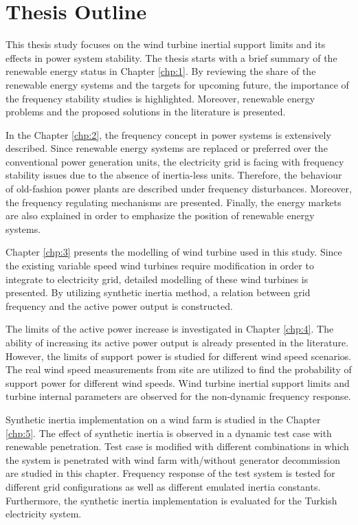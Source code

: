 \section{Thesis Outline}
This thesis study focuses on the wind turbine inertial support limits and its effects in power system stability. The thesis starts with a brief summary of the renewable energy status in Chapter \ref{chp:1}. By reviewing the share of the renewable energy systems and the targets for upcoming future, the importance of the frequency stability studies is highlighted. Moreover, renewable energy problems and the proposed solutions in the literature is presented. \par
In the Chapter \ref{chp:2}, the frequency concept in power systems is extensively described. Since renewable energy systems are replaced or preferred over the conventional power generation units, the electricity grid is facing with frequency stability issues due to the absence of inertia-less units. Therefore, the behaviour of old-fashion power plants are described under frequency disturbances. Moreover, the frequency regulating mechanisms are presented. Finally, the energy markets are also explained in order to emphasize the position of renewable energy systems.\par
Chapter \ref{chp:3} presents the modelling of wind turbine used in this study. Since the existing variable speed wind turbines require modification in order to integrate to electricity grid, detailed modelling of these wind turbines is presented. By utilizing synthetic inertia method, a relation between grid frequency and the active power output is constructed.\par
The limits of the active power increase is investigated in Chapter \ref{chp:4}. The ability of increasing its active power output is already presented in the literature. However, the limits of support power is studied for different wind speed scenarios. The real wind speed measurements from site are utilized to find the probability of support power for different wind speeds. Wind turbine inertial support limits and turbine internal parameters are observed for the non-dynamic frequency response.\par
Synthetic inertia implementation on a wind farm is studied in the Chapter \ref{chp:5}. The effect of synthetic inertia is observed in a dynamic test case with renewable penetration. Test case is modified with different combinations in which the system is penetrated with wind farm with/without generator decommission are studied in this chapter. Frequency response of the test system is tested for different grid configurations as well as different emulated inertia constants. Furthermore, the synthetic inertia implementation is evaluated for the Turkish electricity system. \par
